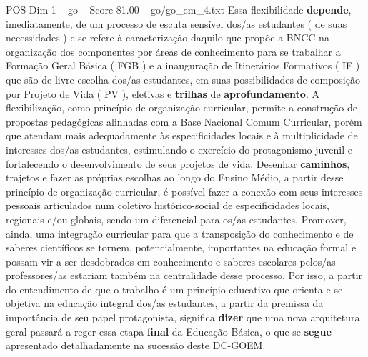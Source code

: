 \begin{textsample}{POS Dim 1 – go – Score 81.00 – go/go\_em\_4.txt}
Essa flexibilidade \textbf{depende}, imediatamente, de um processo de escuta sensível dos/as estudantes ( de suas necessidades ) e se refere à caracterização daquilo que propõe a BNCC na organização dos componentes por áreas de conhecimento para se trabalhar a Formação Geral Básica ( FGB ) e a inauguração de Itinerários Formativos ( IF ) que são de livre escolha dos/as estudantes, em suas possibilidades de composição por Projeto de Vida ( PV ), eletivas e \textbf{trilhas} de \textbf{aprofundamento}.
A flexibilização, como princípio de organização curricular, permite a construção de propostas pedagógicas alinhadas com a Base Nacional Comum Curricular, porém que atendam mais adequadamente às especificidades locais e à multiplicidade de interesses dos/as estudantes, estimulando o exercício do protagonismo juvenil e fortalecendo o desenvolvimento de seus projetos de vida.
Desenhar \textbf{caminhos}, trajetos e fazer as próprias escolhas ao longo do Ensino Médio, a partir desse princípio de organização curricular, é possível fazer a conexão com seus interesses pessoais articulados num coletivo histórico-social de especificidades locais, regionais e/ou globais, sendo um diferencial para os/as estudantes.
Promover, ainda, uma integração curricular para que a transposição do conhecimento e de saberes científicos se tornem, potencialmente, importantes na educação formal e possam vir a ser desdobrados em conhecimento e saberes escolares pelos/as professores/as estariam também na centralidade desse processo.
Por isso, a partir do entendimento de que o trabalho é um princípio educativo que orienta e se objetiva na educação integral dos/as estudantes, a partir da premissa da importância de seu papel protagonista, significa \textbf{dizer} que uma nova arquitetura geral passará a reger essa etapa \textbf{final} da Educação Básica, o que se \textbf{segue} apresentado detalhadamente na sucessão deste DC-GOEM.

\end{textsample}
